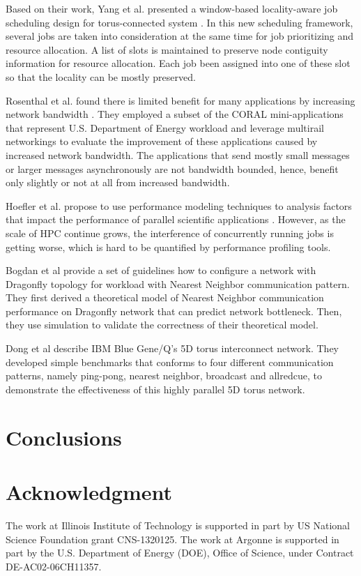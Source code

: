 \documentclass[conference]{IEEEtran}
\begin{document}
Based on their 
work, Yang et al. presented a window-based locality-aware job scheduling design for torus-connected system
\cite{yang-cluster14}. In this new scheduling framework, several jobs are taken into  consideration at the same time for job 
prioritizing and resource allocation. A list of slots is maintained to preserve node contiguity information for
resource allocation. Each job been assigned into one of these slot so that the locality can be mostly preserved.

Rosenthal et al. found there is limited benefit for many applications by
increasing network bandwidth \cite{rosenthal}. They employed a subset of the
CORAL mini-applications that represent U.S. Department of Energy workload and
leverage multirail networkings to evaluate the improvement of these applications
caused by increased network bandwidth. The applications that send mostly small
messages or larger messages asynchronously are not bandwidth bounded, hence,
benefit only slightly or not at all from increased bandwidth.

   

Hoefler et al. propose to use performance modeling techniques to analysis 
factors that impact the performance of parallel scientific applications 
\cite{hoefler-modeling}. However, as the scale of HPC continue grows, the 
interference of concurrently running jobs is getting worse, which is hard to be 
quantified by performance profiling tools.


Bogdan et al provide a set of guidelines how to configure a network with 
Dragonfly topology for workload with Nearest Neighbor communication 
pattern\cite{Bogdan-hpdc14}. They first derived a theoretical model of Nearest 
Neighbor communication performance on Dragonfly network that can predict network 
bottleneck. Then, they use simulation to validate the correctness of their 
theoretical model.

Dong et al describe IBM Blue Gene/Q's 5D torus interconnect
network\cite{Dong-SC11}. They developed simple benchmarks that conforms to four
different communication patterns, namely ping-pong, nearest neighbor, broadcast
and allredcue, to demonstrate the effectiveness of this highly parallel 5D torus
network.



\section{Conclusions}
\label{sec:conclusion}


\section*{Acknowledgment}
\label{sec: ack}
The work at Illinois Institute of Technology is supported in part by
US National Science Foundation grant CNS-1320125. The work at Argonne is
supported in part by the U.S. Department of Energy (DOE), Office of Science,
under Contract DE-AC02-06CH11357.
\end{document}
